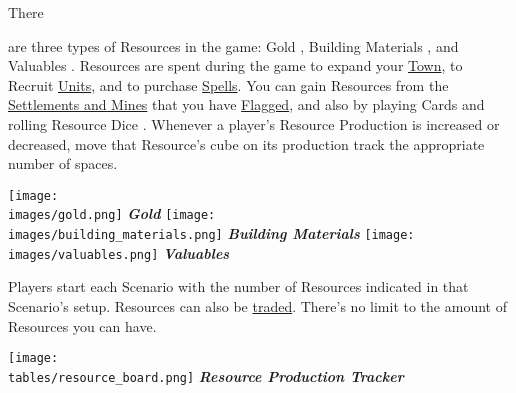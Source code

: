 
\begin{multicols}{2}

\hypertarget{Resources}{There} are three types of Resources in the game: Gold , Building Materials , and Valuables .
Resources are spent during the game to expand your \hyperlink{Town}{Town}, to Recruit \hyperlink{Units}{Units}, and to purchase \hyperlink{spells}{Spells}.
You can gain Resources from the \hyperlink{Mines}{Settlements and Mines} that you have \hyperlink{Categories}{Flagged}, and also by playing Cards and rolling Resource Dice .
Whenever a player's Resource Production is increased or decreased, move that Resource's cube on its production track the appropriate number of spaces.\par
\begin{multicols}{3}
  \centering
  \vspace*{\fill}
  \texttt{[image: \\images/gold.png]}
  \footnotesize\textcolor{darkcandyapplered}{\textit{\textbf{Gold \phantom{Materials}}}}
  \columnbreak
  \vspace*{\fill}
  \texttt{[image: \\images/building\_materials.png]}
  \footnotesize\textcolor{darkcandyapplered}{\textit{\textbf{Building Materials}}}
  \columnbreak
  \vspace*{\fill}
  \texttt{[image: \\images/valuables.png]}
  \footnotesize\textcolor{darkcandyapplered}{\textit{\textbf{Valuables \phantom{Materials}}}}
\end{multicols}
Players start each Scenario with the number of Resources indicated in that Scenario’s setup.
Resources can also be \hyperlink{Trading}{traded}.
There's no limit to the amount of Resources you can have.

\vspace*{\fill}

\columnbreak

\texttt{[image: \\tables/resource\_board.png]}
\smallskip
\centering\footnotesize\textcolor{darkcandyapplered}{\textbf{\textit{Resource Production Tracker}}}
\bigskip


\end{multicols}

